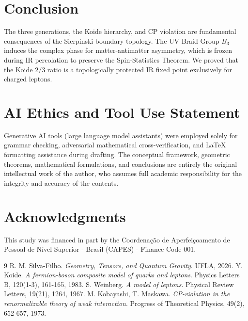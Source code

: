 \documentclass[11pt,a4paper]{amsart}
\theoremstyle{definition}
\begin{document}
\section{Conclusion}
The three generations, the Koide hierarchy, and CP violation are fundamental consequences of the Sierpinski boundary topology. The UV Braid Group $B_3$ induces the complex phase for matter-antimatter asymmetry, which is frozen during IR percolation to preserve the Spin-Statistics Theorem. We proved that the Koide $2/3$ ratio is a topologically protected IR fixed point exclusively for charged leptons.

\section*{AI Ethics and Tool Use Statement}
Generative AI tools (large language model assistants) were employed solely for grammar checking, adversarial mathematical cross-verification, and \LaTeX{} formatting assistance during drafting. The conceptual framework, geometric theorems, mathematical formulations, and conclusions are entirely the original intellectual work of the author, who assumes full academic responsibility for the integrity and accuracy of the contents.

\section*{Acknowledgments}
This study was financed in part by the Coordena\c{c}\~ao de Aperfei\c{c}oamento de Pessoal de N\'ivel Superior - Brasil (CAPES) - Finance Code 001.

\begin{thebibliography}{9}
R. M. Silva-Filho. \emph{Geometry, Tensors, and Quantum Gravity}. UFLA, 2026.
Y. Koide. \emph{A fermion-boson composite model of quarks and leptons}. Physics Letters B, 120(1-3), 161-165, 1983.
S. Weinberg. \emph{A model of leptons}. Physical Review Letters, 19(21), 1264, 1967.
M. Kobayashi, T. Maskawa. \emph{CP-violation in the renormalizable theory of weak interaction}. Progress of Theoretical Physics, 49(2), 652-657, 1973.
\end{thebibliography}
\end{document}
